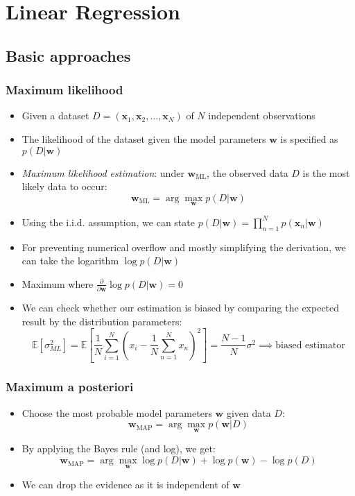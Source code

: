 \section{Linear Regression}

\subsection{Basic approaches}
\subsubsection{Maximum likelihood}
\begin{itemize}
	\item Given a dataset $D=(\bm{x}_1, \bm{x}_2, ..., \bm{x}_N)$ of $N$ independent observations
	\item The likelihood of the dataset given the model parameters $\bm{w}$ is specified as $p(D|\bm{w})$
	\item \textit{Maximum likelihood estimation}: under $\bm{w}_{\text{ML}}$, the observed data $D$ is the most likely data to occur:
	$$\bm{w}_{\text{ML}} = \arg\max_{\bm{w}} p(D|\bm{w})$$
	\item Using the i.i.d. assumption, we can state $p(D|\bm{w}) = \prod\limits_{n=1}^{N} p(\bm{x}_n|\bm{w})$
	\item For preventing numerical overflow and mostly simplifying the derivation, we can take the logarithm $\log p(D|\bm{w})$
	\item Maximum where $\frac{\partial}{\partial \bm{w}}\log p(D|\bm{w}) = 0$
	\item We can check whether our estimation is biased by comparing the expected result by the distribution parameters: $$\mathbb{E}\left[\sigma_{ML}^{2}\right] = \mathbb{E}\left[\frac{1}{N}\sum\limits_{i=1}^{N}\left(x_i - \frac{1}{N}\sum_{n=1}^{N} x_n\right)^2\right] = \frac{N-1}{N} \sigma^2 \implies \text{biased estimator}$$
\end{itemize}
\subsubsection{Maximum a posteriori}
\begin{itemize}
	\item Choose the most probable model parameters $\bm{w}$ given data $D$:
	$$\bm{w}_{\text{MAP}} = \arg\max_{\bm{w}} p(\bm{w}|D)$$
	\item By applying the Bayes rule (and log), we get:
	$$\bm{w}_{\text{MAP}} = \arg\max_{\bm{w}} \log p(D|\bm{w}) + \log p(\bm{w}) - \log p(D)$$
	\item We can drop the evidence as it is independent of $\bm{w}$
\end{itemize}
